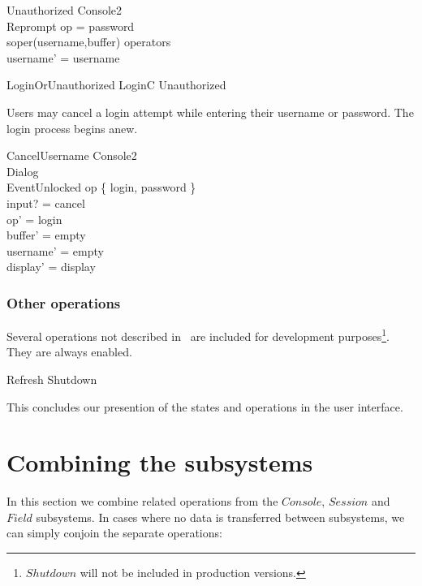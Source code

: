 \begin{schema}{Unauthorized}
	\Delta Console2 \\
	Reprompt 
\where
	op = password \\
	soper(username,buffer) \notin operators \\
	username' = username   
\end{schema}

\begin{zed} LoginOrUnauthorized  LoginC \lor Unauthorized \end{zed}
Users may cancel a login attempt while entering their username or
password.  The login process begins anew.

\begin{schema}{CancelUsername}
	\Delta Console2 \\
	\Delta Dialog \\
	EventUnlocked
\where
	op \in \{ login, password \} \\
	input?  = cancel \\
	op' = login \\
	buffer'  = empty \\
	username' = empty \\
	display' = display
\end{schema}

\subsubsection{Other operations}

Several operations not described in~\cite{jacky92} are included for
development purposes\footnote{$Shutdown$ will not be included in
production versions.}.  They are always enabled.

\begin{zed}
	Refresh 
\also
	Shutdown 
\end{zed}

This concludes our presention of the states and operations in the user
interface.

\section{Combining the subsystems} \label{sect:compose}

In this section we combine related operations from the $Console$,
$Session$ and $Field$ subsystems.  In cases where no data is
transferred between subsystems, we can simply conjoin the separate
operations:

